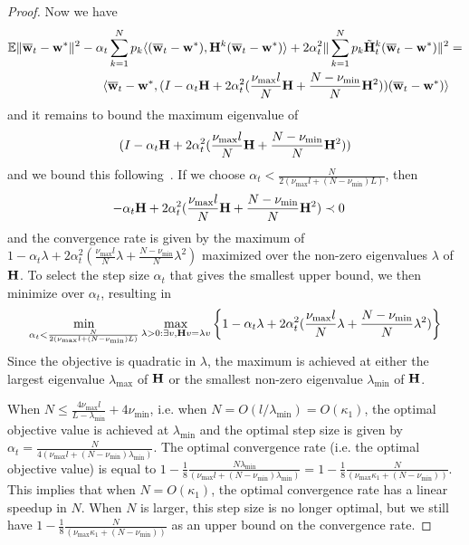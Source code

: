 \begin{proof}
	Now we have 
	\begin{align*}
	\mathbb{E}\|{\overline{\mathbf{w}}}_{t}-{\mathbf{w}}^{\ast}\|^{2}-\alpha_{t}\sum_{k=1}^{N}p_{k}\langle({\overline{\mathbf{w}}}_{t}-{\mathbf{w}}^{\ast}),{\mathbf{H}}^{k}({\overline{\mathbf{w}}}_{t}-{\mathbf{w}}^{\ast})\rangle+2\alpha_{t}^{2}\|\sum_{k=1}^{N}p_{k}\tilde{{\mathbf{H}}}_{t}^{k}({\overline{\mathbf{w}}}_{t}-{\mathbf{w}}^{\ast})\|^{2} & =\\
	\langle{\overline{\mathbf{w}}}_{t}-{\mathbf{w}}^{\ast},(I-\alpha_{t}{\mathbf{H}}+2\alpha_{t}^{2}(\frac{\nu_{\max}l}{N}{\mathbf{H}}+\frac{N-\nu_{\min}}{N}{\mathbf{H}}^{2}))({\overline{\mathbf{w}}}_{t}-{\mathbf{w}}^{\ast})\rangle
	\end{align*}
	and it remains to bound the maximum eigenvalue of 
	\begin{align*}
	(I-\alpha_{t}{\mathbf{H}}+2\alpha_{t}^{2}(\frac{\nu_{\max}l}{N}{\mathbf{H}}+\frac{N-\nu_{\min}}{N}{\mathbf{H}}^{2}))
	\end{align*}
	and we bound this following~\cite{ma2017power}. If we choose $\alpha_{t}<\frac{N}{2(\nu_{\max}l+(N-\nu_{\min})L)}$,
	then 
	\begin{align*}
	-\alpha_{t}{\mathbf{H}}+2\alpha_{t}^{2}(\frac{\nu_{\max}l}{N}{\mathbf{H}}+\frac{N-\nu_{\min}}{N}{\mathbf{H}}^{2}) & \prec0
	\end{align*}
	and the convergence rate is given by the maximum of $1-\alpha_{t}\lambda+2\alpha_{t}^{2}(\frac{\nu_{\max}l}{N}\lambda+\frac{N-\nu_{\min}}{N}\lambda^{2})$
	maximized over the non-zero eigenvalues $\lambda$ of ${\mathbf{H}}$. To select
	the step size $\alpha_{t}$ that gives the smallest upper bound, we
	then minimize over $\alpha_{t}$, resulting in 
	\begin{align*}
	\min_{\alpha_{t}<\frac{N}{2(\nu_{\max}l+(N-\nu_{\min})L)}}\max_{\lambda>0:\exists v,{\mathbf{H}} v=\lambda v}\left\{ 1-\alpha_{t}\lambda+2\alpha_{t}^{2}(\frac{\nu_{\max}l}{N}\lambda+\frac{N-\nu_{\min}}{N}\lambda^{2})\right\} 
	\end{align*}
	Since the objective is quadratic in $\lambda$, the maximum is achieved
	at either the largest eigenvalue $\lambda_{\max}$ of ${\mathbf{H}}$ or the
	smallest non-zero eigenvalue $\lambda_{\min}$ of ${\mathbf{H}}$. 
	
	When $N\leq\frac{4\nu_{\max}l}{L-\lambda_{\min}}+4\nu_{\min}$, i.e.
	when $N=O(l/\lambda_{\min})=O(\kappa_{1})$, the optimal objective
	value is achieved at $\lambda_{\min}$ and the optimal step size is
	given by $\alpha_{t}=\frac{N}{4(\nu_{\max}l+(N-\nu_{\min})\lambda_{\min})}$.
	The optimal convergence rate (i.e. the optimal objective value) is
	equal to $1-\frac{1}{8}\frac{N\lambda_{\min}}{(\nu_{\max}l+(N-\nu_{\min})\lambda_{\min})}=1-\frac{1}{8}\frac{N}{(\nu_{\max}\kappa_{1}+(N-\nu_{\min}))}$.
	This implies that when $N=O(\kappa_{1})$, the optimal convergence
	rate has a linear speedup in $N$. When $N$ is larger, this step
	size is no longer optimal, but we still have $1-\frac{1}{8}\frac{N}{(\nu_{\max}\kappa_{1}+(N-\nu_{\min}))}$
	as an upper bound on the convergence rate. 
	

\end{proof}
